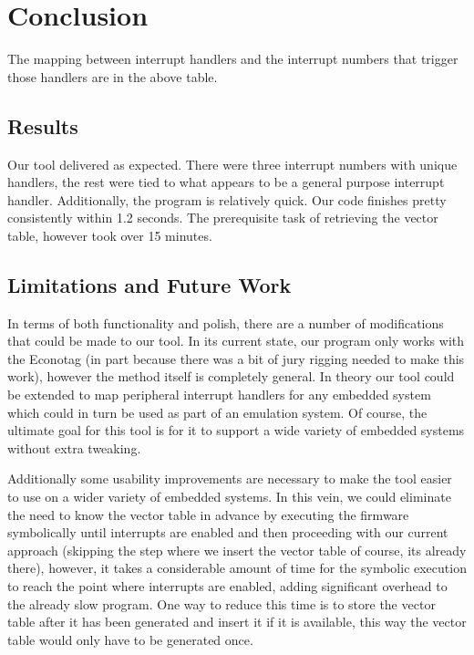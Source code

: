 \documentclass[letterpaper, 10 pt, conference]{ieeeconf}
\begin{document}
\section{Conclusion} \label{conclusion}
The mapping between interrupt handlers and the interrupt numbers that trigger those handlers are in the above table.

\subsection{Results} \label{results} %
Our tool delivered as expected. There were three interrupt numbers with unique handlers, the rest were tied to what appears to be a general purpose interrupt handler. Additionally, the program is relatively quick. Our code finishes pretty consistently within 1.2 seconds. The prerequisite task of retrieving the vector table, however took over 15 minutes. 

\subsection{Limitations and Future Work} \label{limits}
In terms of both functionality and polish, there are a number of modifications that could be made to our tool. In its current state, our program only works with the Econotag (in part because there was a bit of jury rigging needed to make this work), however the method itself is completely general. In theory our tool could be extended to map peripheral interrupt handlers for any embedded system which could in turn be used as part of an emulation system. Of course, the ultimate goal for this tool is for it to support a wide variety of embedded systems without extra tweaking. 

Additionally some usability improvements are necessary to make the tool easier to use on a wider variety of embedded systems. In this vein, we could eliminate the need to know the vector table in advance by executing the firmware symbolically until interrupts are enabled and then proceeding with our current approach (skipping the step where we insert the vector table of course, its already there), however, it takes a considerable amount of time for the symbolic execution to reach the point where interrupts are enabled, adding significant overhead to the already slow program. One way to reduce this time is to store the vector table after it has been generated and insert it if it is available, this way the vector table would only have to be generated once.
\end{document}
